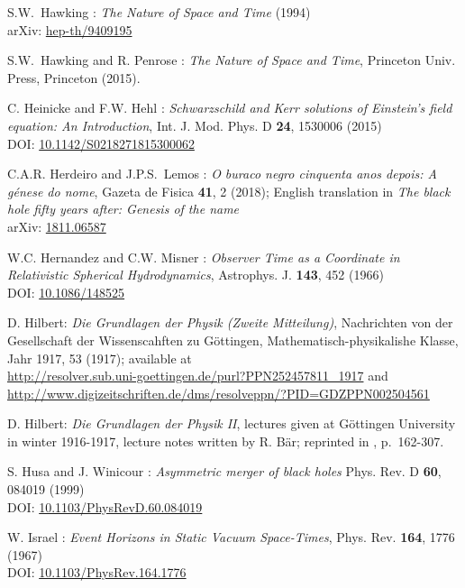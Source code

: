 \begin{thebibliography}{123}
S.W.~Hawking : {\em The Nature of Space and Time} (1994)\\
arXiv: \href{https://arxiv.org/abs/hep-th/9409195}{hep-th/9409195}

S.W.~Hawking and R. Penrose : {\em The Nature of Space and Time},
Princeton Univ. Press, Princeton (2015).

C. Heinicke and F.W. Hehl :
{\em Schwarzschild and Kerr solutions of Einstein's field equation: An Introduction},
Int. J. Mod. Phys. D {\bf 24}, 1530006 (2015)\\
DOI: \href{https://doi.org/10.1142/S0218271815300062}{10.1142/S0218271815300062}

C.A.R. Herdeiro and J.P.S.~Lemos :
\emph{O buraco negro cinquenta anos depois:
A génese do nome},
Gazeta de Fisica {\bf 41}, 2 (2018); English translation in
\emph{The black hole fifty years after: Genesis of the name}\\
arXiv: \href{https://arxiv.org/abs/1811.06587}{1811.06587}

W.C. Hernandez and C.W. Misner :
{\em Observer Time as a Coordinate in Relativistic Spherical Hydrodynamics},
Astrophys. J. {\bf 143}, 452 (1966) \\
DOI: \href{https://doi.org/10.1086/148525}{10.1086/148525}

D. Hilbert:
{\em Die Grundlagen der Physik (Zweite Mitteilung)},
Nachrichten von der Gesellschaft der Wissenscahften zu Göttingen,
Mathematisch-physikalishe Klasse, Jahr 1917, 53 (1917);
available at\\
\url{http://resolver.sub.uni-goettingen.de/purl?PPN252457811_1917} and\\
\url{http://www.digizeitschriften.de/dms/resolveppn/?PID=GDZPPN002504561}

D. Hilbert:
{\em Die Grundlagen der Physik II},
lectures given at Göttingen University in winter 1916-1917,
lecture notes written by R. Bär; reprinted
in \cite{SauerM09}, p.~162-307.

S. Husa and J. Winicour :
{\em Asymmetric merger of black holes}
Phys. Rev. D {\bf 60}, 084019 (1999)\\
DOI: \href{https://doi.org/10.1103/PhysRevD.60.084019}{10.1103/PhysRevD.60.084019}

W. Israel : {\em Event Horizons in Static Vacuum Space-Times},
Phys. Rev. {\bf 164}, 1776 (1967)\\
DOI: \href{https://doi.org/10.1103/PhysRev.164.1776}{10.1103/PhysRev.164.1776}


\end{thebibliography}
